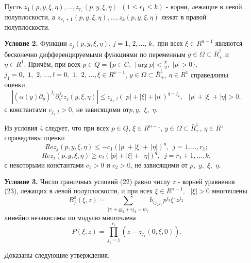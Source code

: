 Пусть $z_1 (p,y,\xi ,\eta ),...,z_{r_1 } (p,y,\xi ,\eta )\,\,\,(1 \le r_1
\le k)$ - корни, лежащие в левой полуплоскости, а $z_{r_1 + 1} (p,y,\xi
,\eta ),...,z_k (p,y,\xi ,\eta )$ лежат в правой полуплоскости.

\textbf{Условие 2.} Функции $z_j (p,y,\xi ,\eta )$, $j = 1,\,2,...,\,k,$ при
всех $\xi \in R^{n - 1}$ являются бесконечно дифференцируемыми функциями по
переменным $y \in \Omega \subset \bar {R}_ + ^1 $ и $\eta \in R^1$. Причём,
при всех $p \in Q = \{p \in C,\,\,\left| {\arg p} \right| < \frac{\pi
}{2},\,\,\left| p \right| > 0\}$, $j_1 = 0,\,\,1,\,\,2,\,...,l =
0,\,\,1,\,\,2,\,...,\xi \in R^{n - 1}$, $y \in \Omega \subset \bar {R}_ +
^1 $, $\eta \in R^1$ справедливы оценки
\[
\left| {(\alpha (y)\partial _y )^{j_1 }\partial _\eta ^{j_2 } z_j (y,\xi
,\eta )} \right| \le c_{j_1 ,l} (\left| p \right| + \left| \xi \right| +
\left| \eta \right|)^{q - j_2 },\,\,\,\,\,\left| p \right| + \left| \xi
\right| + \left| \eta \right| > 0,
\]
с константами $c_{j_1 ,l} > 0$, не зависящими от$p,y,\,\,\xi ,\,\,\eta .$

Из условия 4 следует, что при всех $p \in Q$, $\xi \in R^{n - 1}$, $y \in
\Omega \subset \bar {R}_ + ^1 $, $\eta \in R^1$ справедливы оценки
\begin{equation}
\label{eq4705}
Rez_j (p,y,\xi ,\eta ) \le - c_1 (\left| p \right| + \left| \xi \right| +
\,\left| \eta \right|)^q,\,\,\,j = 1,...,r_1 ;
\end{equation}
\begin{equation}
\label{eq4706}
Rez_j (p,y,\xi ,\eta ) \ge c_2 (\left| p \right| + \left| \xi \right| +
\,\left| \eta \right|)^q,\,\,\,j = r_1 + 1,...,k,
\end{equation}
с некоторыми константами $c_1 >0$
и $c_2 > 0$, не зависящими
от $p,\,\,y,\,\,\xi ,\,\,\eta $.

\textbf{Условие 3.} Число граничных условий (22) равно числу $z$ - корней
уравнения (23), лежащих в левой полуплоскости, и при всех $\xi \in R^{n -
1},\,\,\,\,\left| \xi \right| > 0$ многочлены $$B_j^0 (\xi ,z) =
\sum\limits_{\left| \tau \right| + qj_2 + rj_3 = m_j } {b_{\tau j_2 j_3 }
p^{j_3 }} \xi ^\tau z^{j_2 }\,$$ линейно независимы по модулю многочлена
$$P(\xi ,z) = \prod\limits_{j_1 = 1}^{r_1 } {(z - z_{j_1 } (0,\xi ,0))} .$$

Доказаны следующие утверждения.

